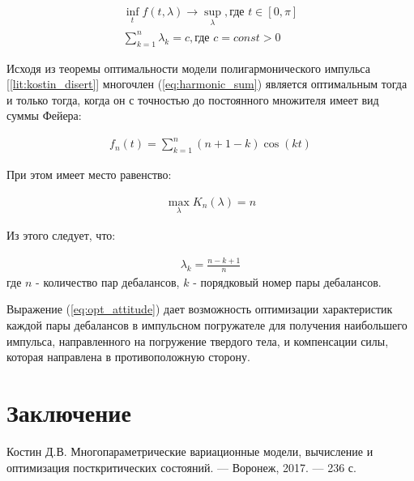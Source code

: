 \begin{equation}\label{eq:math_task}
    \begin{gathered}
        \inf_t f(t, \lambda) \rightarrow \sup_\lambda, \textrm{где } t \in [0, \pi]\\
        \sum\limits_{k = 1}^n \lambda_k = c, \textrm{где } c = const > 0
    \end{gathered}
\end{equation}

Исходя из теоремы оптимальности модели полигармонического импульса [\ref{lit:kostin_disert}] многочлен (\ref{eq:harmonic_sum}) является оптимальным тогда и только тогда, когда он с точностью до постоянного множителя имеет вид суммы Фейера:

\begin{equation}\label{eq:feer}
    \begin{gathered}
        f_n(t) = \sum\limits_{k=1}^n (n+1-k) \cos(kt)
    \end{gathered}
\end{equation}

При этом имеет место равенство:

\begin{equation}\label{eq:max_lambda}
    \begin{gathered}
        \max \limits_{\lambda} K_n(\lambda) = n
    \end{gathered}
\end{equation}

Из этого следует, что:

\begin{equation}\label{eq:opt_attitude}
    \begin{gathered}
        \lambda_k = \frac{n - k + 1}{n}
    \end{gathered}
\end{equation}
где $n$ - количество пар дебалансов, $k$ - порядковый номер пары дебалансов.

Выражение (\ref{eq:opt_attitude}) дает возможность оптимизации характеристик каждой пары дебалансов в импульсном погружателе для получения наибольшего импульса, направленного на погружение твердого тела, и компенсации силы, которая направлена в противоположную сторону.


\clearpage
\section{Заключение}


\clearpage
{}
\begin{thebibliography}{}
    \bibitem{}\label{lit:kostin_disert}
    Костин Д.В. Многопараметрические вариационные модели, вычисление и оптимизация посткритических состояний. --- Воронеж, 2017. --- 236 с.
\end{thebibliography}

